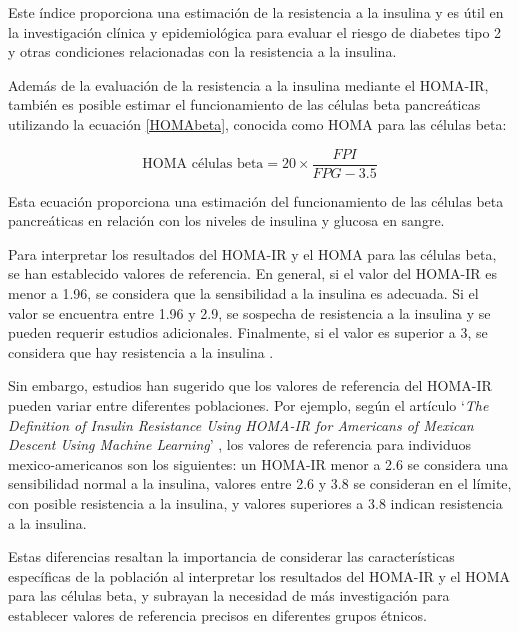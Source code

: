 Este índice proporciona una estimación de la resistencia a la insulina y es útil en la investigación clínica y epidemiológica para evaluar el riesgo de diabetes tipo 2 y otras condiciones relacionadas con la resistencia a la insulina.

Además de la evaluación de la resistencia a la insulina mediante el HOMA-IR, también es posible estimar el funcionamiento de las células beta pancreáticas utilizando la ecuación \eqref{HOMAbeta}, conocida como HOMA para las células beta:

\begin{equation}\label{HOMAbeta}
    \text{HOMA células beta} =  20 \times \frac{FPI}{FPG -3.5}
\end{equation}

Esta ecuación proporciona una estimación del funcionamiento de las células beta pancreáticas en relación con los niveles de insulina y glucosa en sangre.

Para interpretar los resultados del HOMA-IR y el HOMA para las células beta, se han establecido valores de referencia. En general, si el valor del HOMA-IR es menor a 1.96, se considera que la sensibilidad a la insulina es adecuada. Si el valor se encuentra entre 1.96 y 2.9, se sospecha de resistencia a la insulina y se pueden requerir estudios adicionales. Finalmente, si el valor es superior a 3, se considera que hay resistencia a la insulina \cite{limiteHOMA}.

Sin embargo, estudios han sugerido que los valores de referencia del HOMA-IR pueden variar entre diferentes poblaciones. Por ejemplo, según el artículo `\textit{The Definition of Insulin Resistance Using HOMA-IR for Americans of Mexican Descent Using Machine Learning}' \cite{HOMAMex}, los valores de referencia para individuos mexico-americanos son los siguientes: un HOMA-IR menor a 2.6 se considera una sensibilidad normal a la insulina, valores entre 2.6 y 3.8 se consideran en el límite, con posible resistencia a la insulina, y valores superiores a 3.8 indican resistencia a la insulina.

Estas diferencias resaltan la importancia de considerar las características específicas de la población al interpretar los resultados del HOMA-IR y el HOMA para las células beta, y subrayan la necesidad de más investigación para establecer valores de referencia precisos en diferentes grupos étnicos.


